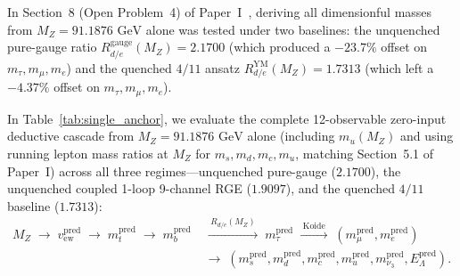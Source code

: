 \documentclass[11pt,a4paper]{article}
\theoremstyle{definition}
\theoremstyle{remark}
\begin{document}
In Section~8 (Open Problem~4) of Paper~I~\cite{PaperI}, deriving all dimensionful masses from $M_Z = 91.1876\text{ GeV}$ alone was tested under two baselines: the unquenched pure-gauge ratio $R_{d/e}^{\mathrm{gauge}}(M_Z) = 2.1700$ (which produced a $-23.7\%$ offset on $m_\tau, m_\mu, m_e$) and the quenched $4/11$ ansatz $R_{d/e}^{\mathrm{YM}}(M_Z) = 1.7313$ (which left a $-4.37\%$ offset on $m_\tau, m_\mu, m_e$).

In Table~\ref{tab:single_anchor}, we evaluate the complete 12-observable zero-input deductive cascade from $M_Z = 91.1876\text{ GeV}$ alone (including $m_u(M_Z)$ and using running lepton mass ratios at $M_Z$ for $m_s, m_d, m_c, m_u$, matching Section~5.1 of Paper~I) across all three regimes---unquenched pure-gauge ($2.1700$), the unquenched coupled 1-loop 9-channel RGE ($1.9097$), and the quenched $4/11$ baseline ($1.7313$):
\begin{equation}
\begin{aligned}
M_Z \;\longrightarrow\; v_{\mathrm{ew}}^{\mathrm{pred}} \;\longrightarrow\; m_t^{\mathrm{pred}} \;\longrightarrow\; m_b^{\mathrm{pred}} &\;\xrightarrow{\;R_{d/e}(M_Z)\;}\; m_\tau^{\mathrm{pred}} \;\xrightarrow{\;\text{Koide}\;}\; (m_\mu^{\mathrm{pred}}, m_e^{\mathrm{pred}}) \\
&\;\longrightarrow\; (m_s^{\mathrm{pred}}, m_d^{\mathrm{pred}}, m_c^{\mathrm{pred}}, m_u^{\mathrm{pred}}, m_{\nu_3}^{\mathrm{pred}}, E_\Lambda^{\mathrm{pred}}).
\end{aligned}
\end{equation}
\end{document}
